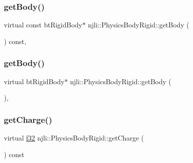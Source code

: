 \subsubsection{\texorpdfstring{get\+Body()}{getBody()}\hspace{0.1cm}{\footnotesize\ttfamily [1/2]}}
{\footnotesize\ttfamily virtual const bt\+Rigid\+Body$\ast$ njli\+::\+Physics\+Body\+Rigid\+::get\+Body (\begin{DoxyParamCaption}{ }\end{DoxyParamCaption}) const\hspace{0.3cm}{\ttfamily [protected]}, {\ttfamily [virtual]}}

\mbox{\label{classnjli_1_1_physics_body_rigid_abe9121bf7697467e7eddd8cd5da2cdd5}} 
\subsubsection{\texorpdfstring{get\+Body()}{getBody()}\hspace{0.1cm}{\footnotesize\ttfamily [2/2]}}
{\footnotesize\ttfamily virtual bt\+Rigid\+Body$\ast$ njli\+::\+Physics\+Body\+Rigid\+::get\+Body (\begin{DoxyParamCaption}{ }\end{DoxyParamCaption})\hspace{0.3cm}{\ttfamily [protected]}, {\ttfamily [virtual]}}

\mbox{\label{classnjli_1_1_physics_body_rigid_acbf656bd51d8b91a3795a615eb364f9c}} 
\subsubsection{\texorpdfstring{get\+Charge()}{getCharge()}}
{\footnotesize\ttfamily virtual \mbox{\hyperlink{_util_8h_a5f6906312a689f27d70e9d086649d3fd}{f32}} njli\+::\+Physics\+Body\+Rigid\+::get\+Charge (\begin{DoxyParamCaption}{ }\end{DoxyParamCaption}) const\hspace{0.3cm}{\ttfamily [virtual]}}

